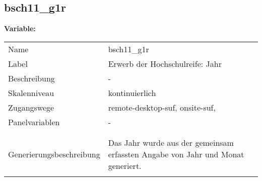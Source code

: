 	
	
	\subsection{bsch11\_g1r}
	\label{subSection:bsch11_g1r}

	\noindent\textbf{Variable:}\\
		\begin{tabular}{lL{11.3cm}}
			\label{tableVariable:bsch11_g1r}
			Name & bsch11\_g1r \\
			Label & Erwerb der Hochschulreife: Jahr \\
			Beschreibung & - \\
			Skalenniveau & kontinuierlich \\
			Zugangswege &
				remote-desktop-suf,
				onsite-suf,
 \\
			Panelvariablen & -
			 \\
			 \\
 \\
					Generierungsbeschreibung & Das Jahr wurde aus der gemeinsam erfassten Angabe von Jahr und Monat generiert. 
				 \\	
			 \\
		\end{tabular}





